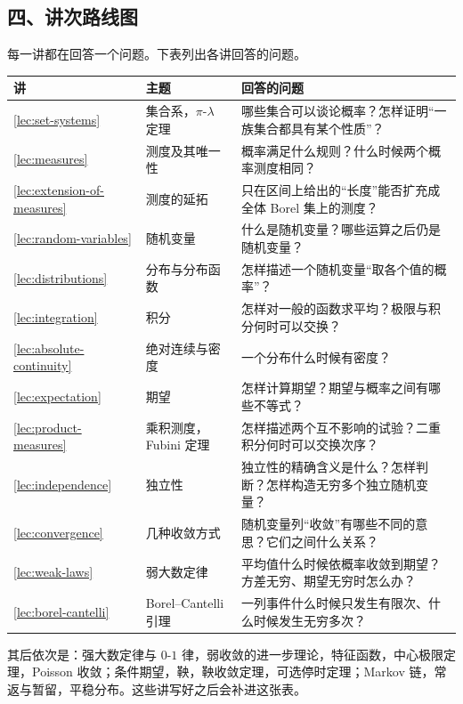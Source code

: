 \subsection*{四、讲次路线图}

每一讲都在回答一个问题。下表列出各讲回答的问题。

\begin{center}
\small
\begin{tabular}{p{1.2em}p{12.3em}p{20.5em}}
\toprule
讲 & 主题 & 回答的问题\\
\midrule
\ref{lec:set-systems} & 集合系，$\pi$-$\lambda$ 定理 & 哪些集合可以谈论概率？怎样证明“一族集合都具有某个性质”？\\
\ref{lec:measures} & 测度及其唯一性 & 概率满足什么规则？什么时候两个概率测度相同？\\
\ref{lec:extension-of-measures} & 测度的延拓 & 只在区间上给出的“长度”能否扩充成全体 Borel 集上的测度？\\
\ref{lec:random-variables} & 随机变量 & 什么是随机变量？哪些运算之后仍是随机变量？\\
\ref{lec:distributions} & 分布与分布函数 & 怎样描述一个随机变量“取各个值的概率”？\\
\ref{lec:integration} & 积分 & 怎样对一般的函数求平均？极限与积分何时可以交换？\\
\ref{lec:absolute-continuity} & 绝对连续与密度 & 一个分布什么时候有密度？\\
\ref{lec:expectation} & 期望 & 怎样计算期望？期望与概率之间有哪些不等式？\\
\ref{lec:product-measures} & 乘积测度，Fubini 定理 & 怎样描述两个互不影响的试验？二重积分何时可以交换次序？\\
\ref{lec:independence} & 独立性 & 独立性的精确含义是什么？怎样判断？怎样构造无穷多个独立随机变量？\\
\ref{lec:convergence} & 几种收敛方式 & 随机变量列“收敛”有哪些不同的意思？它们之间什么关系？\\
\ref{lec:weak-laws} & 弱大数定律 & 平均值什么时候依概率收敛到期望？方差无穷、期望无穷时怎么办？\\
\ref{lec:borel-cantelli} & Borel--Cantelli 引理 & 一列事件什么时候只发生有限次、什么时候发生无穷多次？\\
\bottomrule
\end{tabular}
\end{center}
其后依次是：强大数定律与 $0$-$1$ 律，弱收敛的进一步理论，特征函数，中心极限定理，Poisson 收敛；条件期望，鞅，鞅收敛定理，可选停时定理；Markov 链，常返与暂留，平稳分布。这些讲写好之后会补进这张表。

